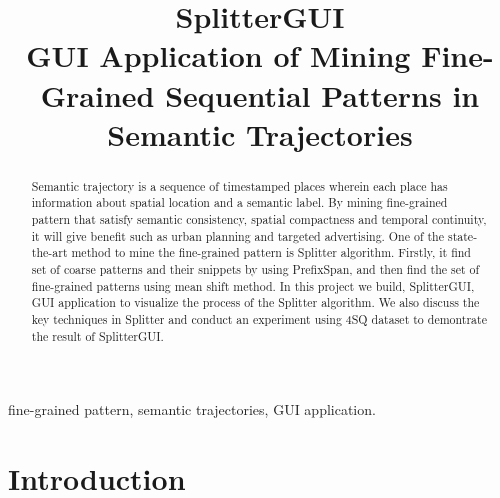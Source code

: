 \documentclass[conference]{IEEEtran}
\begin{document}
\title{SplitterGUI\\
{\large GUI Application of Mining Fine-Grained Sequential Patterns in Semantic Trajectories}
}

\author{
}

\maketitle

\begin{abstract}
Semantic trajectory is a sequence of timestamped places wherein each place has information about spatial location and a semantic label. By mining fine-grained pattern that satisfy semantic consistency, spatial compactness and temporal continuity, it will give benefit such as urban planning and targeted advertising. One of the state-the-art method to mine the fine-grained pattern is Splitter algorithm. Firstly, it find set of coarse patterns and their snippets by using PrefixSpan, and then find the set of fine-grained patterns using mean shift method. In this project we build, SplitterGUI, GUI application to visualize the process of the Splitter algorithm. We also discuss the key techniques in Splitter and conduct an experiment using 4SQ dataset to demontrate the result of SplitterGUI.

\end{abstract}

\begin{IEEEkeywords}
fine-grained pattern, semantic trajectories, GUI application.
\end{IEEEkeywords}

\section{Introduction}
\end{document}
